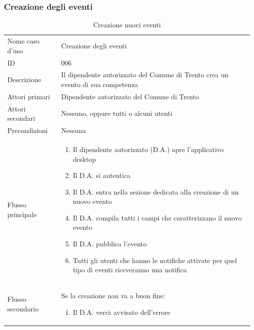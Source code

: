 \documentclass{article}
\begin{document}
\subsubsection{Creazione degli eventi}

\begin{table}[htbp]
    \label{8.3.2}
    \centering
    \begin{tabularx}{\textwidth}{| l | p{} |}
        \Xhline{2pt} %
        Nome caso d'uso & Creazione degli eventi \\
        \Xhline{2pt} %
        ID & 006 \\
        \hline
        Descrizione & Il dipendente autorizzato del Comune di Trento crea un evento di sua competenza\\
        \hline
        Attori primari & Dipendente autorizzato del Comune di Trento\\
        \hline
        Attori secondari & Nessuno, oppure tutti o alcuni utenti \\
        \hline
        Precondizioni & Nessuna \\
        \hline
        Flusso principale & 
        \begin{enumerate}[topsep=5pt,partopsep=0pt,parsep=0pt,itemsep=0pt,before=\vspace{-\baselineskip},after=\vspace{-\baselineskip}]                
            \item Il dipendente autorizzato (D.A.) apre l'applicativo desktop
            \item Il D.A. si autentica
            \item Il D.A. entra nella sezione dedicata alla creazione di un nuovo evento
            \item Il D.A. compila tutti i campi che caratterizzano il nuovo evento
            \item Il D.A. pubblica l'evento
            \item Tutti gli utenti che hanno le notifiche attivate per quel tipo di eventi riceveranno una notifica
        \end{enumerate}
        \\
        \hline
        Flusso secondario & 
        Se la creazione non va a buon fine:
        \begin{enumerate}[topsep=10pt,partopsep=0pt,parsep=0pt,itemsep=0pt,before=\vspace{-\baselineskip},after=\vspace{-\baselineskip}]                
            \item Il D.A. verrà avvisato dell'errore
        \end{enumerate}
        \\
        \hline
    \end{tabularx}
    \caption{Creazione nuovi eventi}
    \label{tab:tabella_use_case006}
\end{table}
\end{document}

